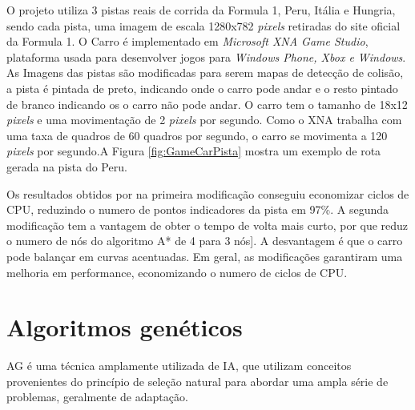 O projeto utiliza 3 pistas reais de corrida da Formula 1, Peru, Itália e Hungria, sendo cada pista, uma imagem de escala 1280x782 \textit{pixels} retiradas do site oficial da Formula 1. O Carro é implementado em \textit{Microsoft XNA Game Studio}, plataforma usada para desenvolver jogos para \textit{Windows Phone, Xbox e Windows}. As Imagens das pistas são modificadas para serem mapas de detecção de colisão, a pista é pintada de preto, indicando onde o carro pode andar e o resto pintado de branco indicando os o carro não pode andar. O carro tem o tamanho de 18x12 \textit{pixels} e uma movimentação de 2 \textit{pixels} por segundo. Como o XNA trabalha com uma taxa de quadros de 60 quadros por segundo, o carro se movimenta a 120 \textit{pixels} por segundo.A Figura \ref{fig:GameCarPista} mostra um exemplo de rota gerada na pista do Peru.

\begin{minipage}{\linewidth}
	\label{fig:GameCarPista}
\end{minipage}

Os resultados obtidos por \cite{JungTing} na primeira modificação conseguiu economizar ciclos de CPU, reduzindo o numero de pontos indicadores da pista em 97\%. A segunda modificação tem a vantagem de obter o tempo de volta mais curto, por que reduz o numero de nós do algoritmo A* de 4 para 3 nós]. A desvantagem é que o carro pode balançar em curvas acentuadas. Em geral, as modificações garantiram uma melhoria em performance, economizando o numero de ciclos de CPU.

\section{Algoritmos genéticos}

AG é uma técnica amplamente utilizada de IA, que utilizam conceitos provenientes do princípio de seleção natural para abordar uma  ampla série de problemas, geralmente de adaptação. \cite{DiogoCLucas}


